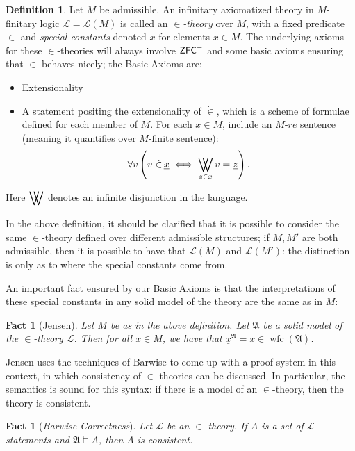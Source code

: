 \documentclass{amsart}
\newtheorem{fact}[theorem]{Fact}
\theoremstyle{definition}
\newtheorem{definition}[theorem]{Definition}
\theoremstyle{remark}
\newcommand{\ZFC}{\textup{\ensuremath{\textsf{ZFC}}}}
\DeclareMathOperator{\wfc}{wfc}
\DeclareMathOperator*{\bigdoublevee}{\bigvee\mkern-15mu\bigvee}
\begin{document}
\begin{definition} \label{def:InTheoriesAndBasicAxioms} Let $M$ be admissible. An infinitary axiomatized theory in $M$-finitary logic $\mathcal L = \mathcal L(M)$ is called an \textit{$\in$-theory} over $M$, with a fixed predicate $\dot \in$ and \emph{special constants} denoted $\underline x$ for elements $x \in M$. The underlying axioms for these $\in$-theories will always involve $\ZFC^-$ and some basic axioms ensuring that $\dot \in$ behaves nicely; 
the \textsf{Basic Axioms} are: \begin{itemize}
	\item \textsf{Extensionality}
	\item A statement positing the extensionality of $\dot \in$, which is a scheme of formulae defined for each member of $M$. For each $x \in M$, include an $M$-$re$ sentence (meaning it quantifies over $M$-finite sentence): 
	$$\forall v \left( v \ \dot \in\, \underline x \iff \bigdoublevee_{z \in x} v= \underline z \right).$$
\end{itemize} Here $\displaystyle\bigdoublevee$ denotes an infinite disjunction in the language.\end{definition}

In the above definition, it should be clarified that it is possible to consider the same $\in$-theory defined over different admissible structures; if $M, M'$ are both admissible, then it is possible to have that $\mathcal L(M)$ and $\mathcal L(M')$: the distinction is only as to where the special constants come from. 

An important fact ensured by our \textsf{Basic Axioms} is that the interpretations of these special constants in any solid model of the theory are the same as in $M$:

\begin{fact}[Jensen] Let $M$ be as in the above definition. Let $\mathfrak A$ be a solid model of the $\in$-theory $\mathcal L$. Then for all $x \in M$, we have that $\underline{x}^{\mathfrak A} = x \in \wfc(\mathfrak A)$. \end{fact}

Jensen uses the techniques of Barwise to come up with a proof system in this context, in which consistency of $\in$-theories can be discussed. In particular, the semantics is sound for this syntax: if there is a model of an \(\in\)-theory, then the theory is consistent. 
\begin{fact}[\emph{Barwise Correctness}] \label{fact:correctness} 
Let $\mathcal L$ be an $\in$-theory. If $A$ is a set of $\mathcal L$-statements and $\mathfrak A \models A$, then $A$ is consistent. \end{fact}
\end{document}
